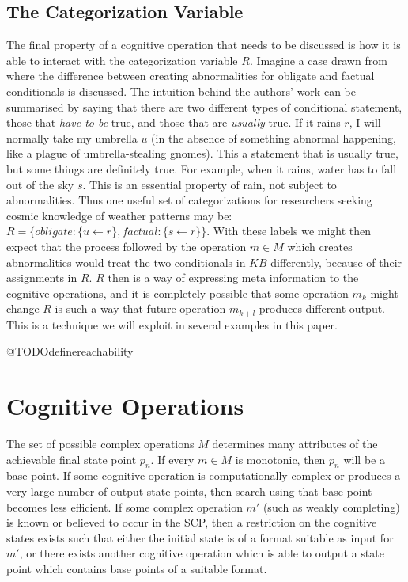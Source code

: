 \subsection{The Categorization Variable}
The final property of a cognitive operation that needs to be discussed is how it is able to interact with the categorization variable $R$. Imagine a case drawn from \cite{saldanha2017weak} where the difference between creating abnormalities for obligate and factual conditionals is discussed. The intuition behind the authors' work can be summarised by saying that there are two different types of conditional statement, those that \textit{have to be} true, and those that are \textit{usually} true. If it rains $r$, I will normally take my umbrella $u$ (in the absence of something abnormal happening, like a plague of umbrella-stealing gnomes). This a statement that is usually true, but some things are definitely true. For example, when it rains, water has to fall out of the sky $s$. This is an essential property of rain, not subject to abnormalities. Thus one useful set of categorizations for researchers seeking cosmic knowledge of weather patterns may be: $R=\{obligate: \{u \leftarrow r\}, factual: \{s \leftarrow r\} \}$. With these labels we might then expect that the process followed by the operation $m \in M$ which creates abnormalities would treat the two conditionals in $KB$ differently, because of their assignments in $R$. $R$ then is a way of expressing meta information to the cognitive operations, and it is completely possible that some operation $m_k$ might change $R$ is such a way that future operation $m_{k+l}$ produces different output. This is a technique we will exploit in several examples in this paper.

@TODOdefinereachability
\section{Cognitive Operations}
The set of possible complex operations $M$ determines many attributes of the achievable final state point $p_n$. If every $m \in M$ is monotonic, then $p_n$ will be a base point. If some cognitive operation is computationally complex or produces a very large number of output state points, then search using that base point becomes less efficient. If some complex operation $m'$ (such as weakly completing) is known or believed to occur in the SCP, then a restriction on the cognitive states exists such that either the initial state is of a format suitable as input for $m'$, or there exists another cognitive operation which is able to output a state point which contains base points of a suitable format.

